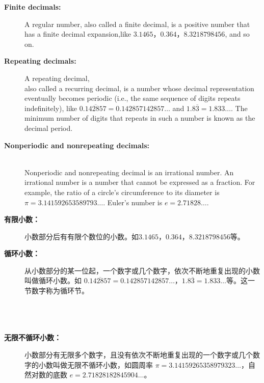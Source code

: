 \begin{paracol}{2}
\begin{description}
\item [{\bf Finite decimals: }] A regular number, also called a finite decimal, is a positive number that has a finite decimal expansion,like $3.1465$，$0.364$，$8.3218798456$, and so on. 
\item [{\bf Repeating decimals: }] A repeating decimal, \\
 also called a recurring decimal, is a number whose decimal representation eventually becomes periodic (i.e., the same sequence of digits repeats indefinitely), like $0.\overline{142857}=0.142857142857\ldots$ and $1.8\overline{3}=1.833\ldots$. The minimum number of digits that repeats in such a number is known as the decimal period. 
\item [{\bf Nonperiodic and nonrepeating decimals: }] \ \\ Nonperiodic and nonrepeating decimal is an irrational number. An irrational number is a number that cannot be expressed as a fraction. For example, the ratio of a circle's circumference to its diameter is $\pi =3.141592653589793\ldots$.  Euler's number is $e=2.71828\ldots$.
\end{description}
\switchcolumn
\begin{description}
\item [{\bf 有限小数：}] 小数部分后有有限个数位的小数。如$3.1465$，$0.364$，$8.3218798456$等。\\ 
\item [{\bf 循环小数：}] 从小数部分的某一位起，一个数字或几个数字，依次不断地重复出现的小数叫做循环小数。如 $0.\overline{142857}=0.142857142857\ldots$，$1.8\overline{3}=1.833\ldots$等。这一节数字称为循环节。\\ \\ \\ \\  %
\item [{\bf 无限不循环小数：}] 小数部分有无限多个数字，且没有依次不断地重复出现的一个数字或几个数字的小数叫做无限不循环小数，如圆周率 $\pi =3.14159265358979323\ldots$，自然对数的底数 $e=2.71828182845904\ldots$。%
\end{description}
\end{paracol}

